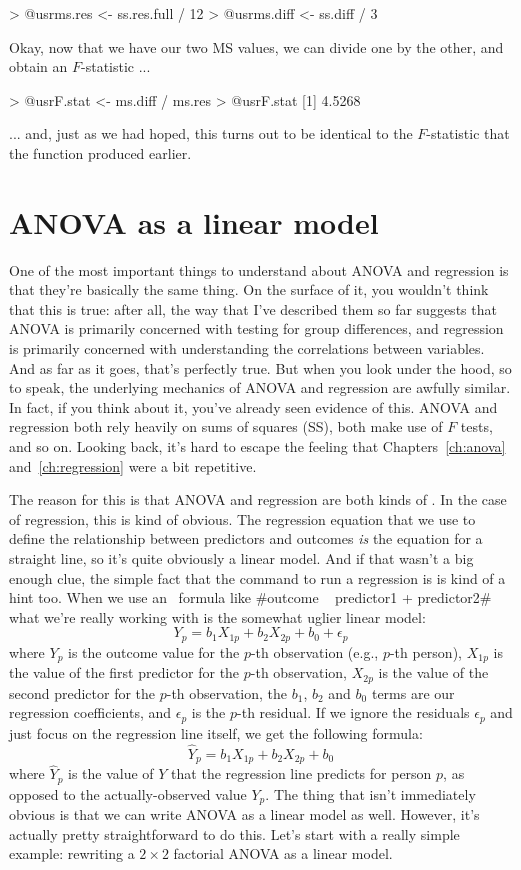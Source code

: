 \begin{rblock1}
> @usr{ms.res <- ss.res.full / 12}
> @usr{ms.diff <- ss.diff / 3 }
\end{rblock1}
Okay, now that we have our two MS values, we can divide one by the other, and obtain an $F$-statistic ...
\begin{rblock1}
> @usr{F.stat <- ms.diff / ms.res} 
> @usr{F.stat}
[1] 4.5268
\end{rblock1}
... and, just as we had hoped, this turns out to be identical to the $F$-statistic that the  function produced earlier. 


\section{ANOVA as a linear model\label{sec:anovalm}}

One of the most important things to understand about ANOVA and regression is that they're basically the same thing. On the surface of it, you wouldn't think that this is true: after all, the way that I've described them so far suggests that ANOVA is primarily concerned with testing for group differences, and regression is primarily concerned with understanding the correlations between variables. And as far as it goes, that's perfectly true. But when you look under the hood, so to speak, the underlying mechanics of ANOVA and regression are awfully similar. In fact, if you think about it, you've already seen evidence of this. ANOVA and regression both rely heavily on sums of squares (SS), both make use of $F$ tests, and so on. Looking back, it's hard to escape the feeling that Chapters~\ref{ch:anova} and~\ref{ch:regression} were a bit repetitive. 

The reason for this is that ANOVA and regression are both kinds of . In the case of regression, this is kind of obvious. The regression equation that we use to define the relationship between predictors and outcomes {\it is} the equation for a straight line, so it's quite obviously a linear model. And if that wasn't a big enough clue, the simple fact that the command to run a regression is  is kind of a hint too. When we use an \R\ formula like \rtextverb#outcome ~ predictor1 + predictor2# what we're really working with is the somewhat uglier linear model:
$$
Y_{p} = b_1 X_{1p} + b_2 X_{2p} + b_0 + \epsilon_{p}
$$
where $Y_p$ is the outcome value for the $p$-th observation (e.g., $p$-th person), $X_{1p}$ is the value of the first predictor for the $p$-th observation, $X_{2p}$ is the value of the second predictor for the $p$-th observation, the $b_1$, $b_2$ and $b_0$ terms are our regression coefficients, and $\epsilon_{p}$ is the $p$-th residual. If we ignore the residuals $\epsilon_{p}$ and just focus on the regression line itself, we get the following formula:
$$
\hat{Y}_{p} = b_1 X_{1p} + b_2 X_{2p} + b_0
$$
where $\hat{Y}_p$ is the value of $Y$ that the regression line predicts for person $p$, as opposed to the actually-observed value $Y_p$. The thing that isn't immediately obvious is that we can write ANOVA as a linear model as well. However, it's actually pretty straightforward to do this. Let's start with a really simple example: rewriting a $2 \times 2$ factorial ANOVA as a linear model. 


